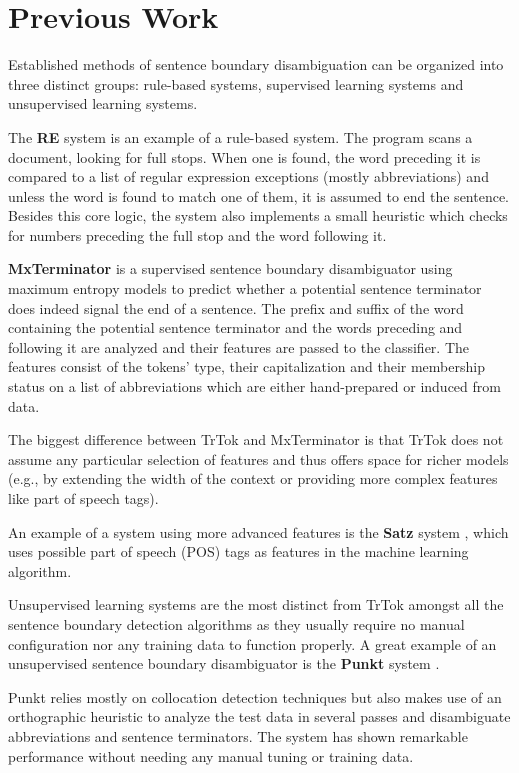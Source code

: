 \section{Previous Work}
\label{sec:previous-work}

Established methods of sentence boundary disambiguation can be
organized into three distinct groups: rule-based systems, supervised
learning systems and unsupervised learning systems.

The \textbf{RE} system \cite{sbd-re} is an example of a rule-based
system. The program scans a document, looking for full stops. When one
is found, the word preceding it is compared to a list of regular
expression exceptions (mostly abbreviations) and unless the word is
found to match one of them, it is assumed to end the sentence. Besides
this core logic, the system also implements a small heuristic which
checks for numbers preceding the full stop and the word following it.

\textbf{MxTerminator} \cite{sbd-mxterm} is a supervised sentence
boundary disambiguator using maximum entropy models to predict whether
a potential sentence terminator does indeed signal the end of a
sentence. The prefix and suffix of the word containing the potential
sentence terminator and the words preceding and following it are
analyzed and their features are passed to the classifier. The features
consist of the tokens' type, their capitalization and their membership
status on a list of abbreviations which are either hand-prepared or
induced from data.

The biggest difference between TrTok and MxTerminator is that TrTok
does not assume any particular selection of features and thus offers
space for richer models (e.g., by extending the width of the context
or providing more complex features like part of speech tags).

An example of a system using more advanced features is the
\textbf{Satz} system \cite{sbd-satz}, which uses possible part of
speech (POS) tags as features in the machine learning algorithm.

Unsupervised learning systems are the most distinct from TrTok amongst
all the sentence boundary detection algorithms as they usually require
no manual configuration nor any training data to function properly. A
great example of an unsupervised sentence boundary disambiguator is
the \textbf{Punkt} system \cite{sbd-punkt}.

Punkt relies mostly on collocation detection techniques but also makes
use of an orthographic heuristic to analyze the test data in several
passes and disambiguate abbreviations and sentence terminators. The
system has shown remarkable performance without needing any manual
tuning or training data.
